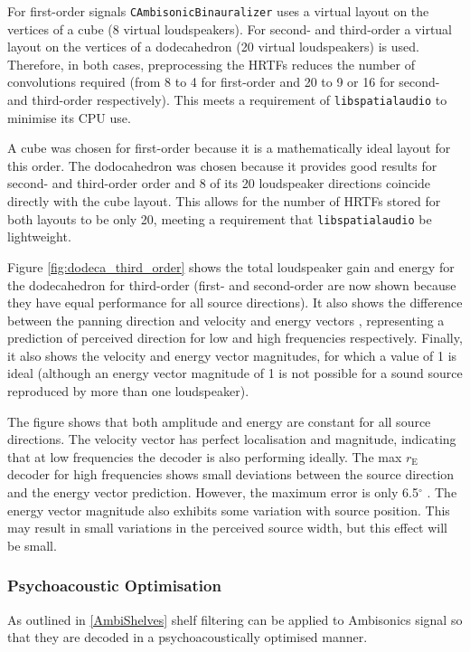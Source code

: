 \documentclass[12pt]{report}
\def\libspataud{\texttt{libspatialaudio}\xspace}
\def\deg{$^{\circ}$ }
\newcommand{\code}[1]{\texttt{#1}}
\begin{document}
For first-order signals \code{CAmbisonicBinauralizer} uses a virtual layout on the vertices of a cube (8 virtual loudspeakers).
For second- and third-order a virtual layout on the vertices of a dodecahedron (20 virtual loudspeakers) is used.
Therefore, in both cases, preprocessing the HRTFs reduces the number of convolutions required (from 8 to 4 for first-order and 20 to 9 or 16 for second- and third-order respectively).
This meets a requirement of \libspataud to minimise its CPU use.

A cube was chosen for first-order because it is a mathematically ideal layout for this order.
The dodocahedron was chosen because it provides good results for second- and third-order order and 8 of its 20 loudspeaker directions coincide directly with the cube layout.
This allows for the number of HRTFs stored for both layouts to be only 20, meeting a requirement that \libspataud be lightweight.

Figure \ref{fig:dodeca_third_order} shows the total loudspeaker gain and energy for the dodecahedron for third-order (first- and second-order are now shown because they have equal performance for all source directions).
It also shows the difference between the panning direction and velocity and energy vectors \cite{Gerzon1992a}, representing a prediction of perceived direction for low and high frequencies respectively.
Finally, it also shows the velocity and energy vector magnitudes, for which a value of 1 is ideal (although an energy vector magnitude of 1 is not possible for a sound source reproduced by more than one loudspeaker).

The figure shows that both amplitude and energy are constant for all source directions.
The velocity vector has perfect localisation and magnitude, indicating that at low frequencies the decoder is also performing ideally.
The max $r_{\mathrm{E}}$ decoder for high frequencies shows small deviations between the source direction and the energy vector prediction.
However, the maximum error is only 6.5\deg.
The energy vector magnitude also exhibits some variation with source position.
This may result in small variations in the perceived source width, but this effect will be small.

\subsubsection{Psychoacoustic Optimisation}

As outlined in \cref{AmbiShelves} shelf filtering can be applied to Ambisonics signal so that they are decoded in a psychoacoustically optimised manner.
\end{document}
